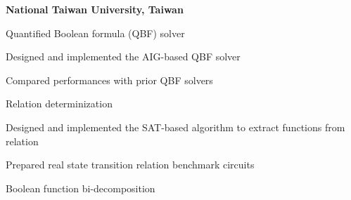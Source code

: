 \begin{myexp}
\item \textbf{National Taiwan University, Taiwan}   
    \begin{myexp}
    \item Quantified Boolean formula (QBF) solver 
        \begin{mybullet}
            \item Designed and implemented the AIG-based QBF solver
            \item Compared performances with prior QBF solvers
        \end{mybullet}
    \item Relation determinization 
        \begin{mybullet}
            \item Designed and implemented the SAT-based algorithm to extract functions from relation
            \item Prepared real state transition relation benchmark circuits
        \end{mybullet}
    \item Boolean function bi-decomposition

\end{myexp}
\end{myexp}
